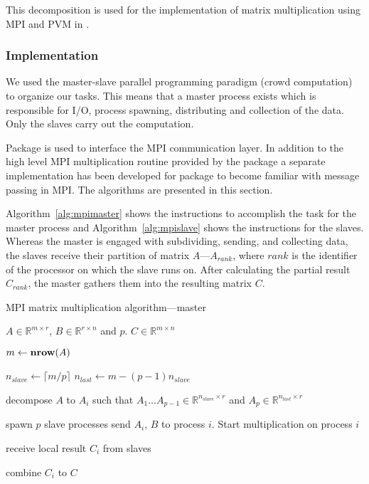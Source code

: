 This decomposition is used for the implementation of matrix
multiplication using MPI and PVM in .

\subsubsection{Implementation}

We used the master-slave parallel programming paradigm (crowd
computation) to organize our tasks. This means that a master process
exists which is responsible for I/O, process spawning, distributing
and collection of the data. Only the slaves carry out the
computation.

Package  is used to interface the MPI communication
layer. In addition to the high level MPI multiplication routine 
 provided by the package  a separate implementation has
been developed for package  to become familiar with message
passing in MPI. The algorithms are presented in this section.


Algorithm~\ref{alg:mpimaster} shows the instructions to accomplish the
task for the master process and Algorithm~\ref{alg:mpislave} shows the
instructions for the slaves. Whereas the master is engaged with
subdividing, sending, and collecting data, the slaves receive their
partition of matrix $A$---$A_{rank}$, where $rank$ is the identifier of
the processor on which the slave runs on. After calculating the
partial result $C_{rank}$, the master gathers them into the resulting
matrix $C$.  

\begin{algorithm}
\caption{MPI matrix multiplication algorithm---master}
\label{alg:mpimaster}
\begin{algorithmic}[1]

  \REQUIRE $A \in \mathbb{R}^{m \times r}$, $B \in \mathbb{R}^{r
    \times n}$ and $p$.
  \ENSURE $C \in \mathbb{R}^{m \times n}$

  \STATE $m \leftarrow \textbf{nrow} (A)$
  
  \STATE $n_{slave} \leftarrow \lceil m/p \rceil$
  \STATE $n_{last} \leftarrow m - (p - 1) n_{slave} $
  
  \STATE decompose $A$ to $A_i$ such that $A_1 ... A_{p-1} \in
  \mathbb{R}^{n_{slave} \times r}$ and $A_p \in \mathbb{R}^{n_{last} \times r} $  
  
  \STATE spawn $p$ slave processes
    \STATE send $A_i$, $B$ to process $i$. Start
    multiplication on process $i$ 
  \ENDFOR
  
    \STATE receive local result $C_{i}$ from slaves
  \ENDFOR
  
  \STATE combine $C_{i}$ to $C$

\end{algorithmic}
\end{algorithm}

